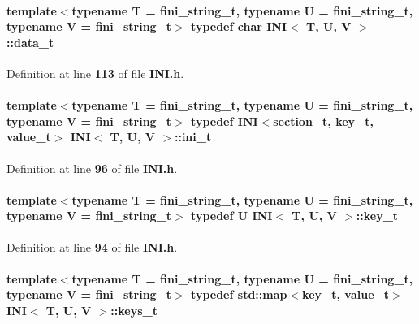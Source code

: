 \paragraph[{data\+\_\+t}]{\setlength{\rightskip}{0pt plus 5cm}template$<$typename T  = fini\+\_\+string\+\_\+t, typename U  = fini\+\_\+string\+\_\+t, typename V  = fini\+\_\+string\+\_\+t$>$ typedef char {\bf I\+NI}$<$ T, U, V $>$\+::{\bf data\+\_\+t}}\label{classINI_a611e44f4d3abb28d901f7e2aaf183811}


Definition at line {\bf 113} of file {\bf I\+N\+I.\+h}.

\paragraph[{ini\+\_\+t}]{\setlength{\rightskip}{0pt plus 5cm}template$<$typename T  = fini\+\_\+string\+\_\+t, typename U  = fini\+\_\+string\+\_\+t, typename V  = fini\+\_\+string\+\_\+t$>$ typedef {\bf I\+NI}$<${\bf section\+\_\+t}, {\bf key\+\_\+t}, {\bf value\+\_\+t}$>$ {\bf I\+NI}$<$ T, U, V $>$\+::{\bf ini\+\_\+t}}\label{classINI_a510efd26938d16fcaac1b3b8bdd47f34}


Definition at line {\bf 96} of file {\bf I\+N\+I.\+h}.

\paragraph[{key\+\_\+t}]{\setlength{\rightskip}{0pt plus 5cm}template$<$typename T  = fini\+\_\+string\+\_\+t, typename U  = fini\+\_\+string\+\_\+t, typename V  = fini\+\_\+string\+\_\+t$>$ typedef U {\bf I\+NI}$<$ T, U, V $>$\+::{\bf key\+\_\+t}}\label{classINI_acfa659efbac1eb0c62c1a910b0b09541}


Definition at line {\bf 94} of file {\bf I\+N\+I.\+h}.

\paragraph[{keys\+\_\+t}]{\setlength{\rightskip}{0pt plus 5cm}template$<$typename T  = fini\+\_\+string\+\_\+t, typename U  = fini\+\_\+string\+\_\+t, typename V  = fini\+\_\+string\+\_\+t$>$ typedef std\+::map$<${\bf key\+\_\+t}, {\bf value\+\_\+t}$>$ {\bf I\+NI}$<$ T, U, V $>$\+::{\bf keys\+\_\+t}}\label{classINI_a4254e881abdbf891a408cb032e0d717d}


